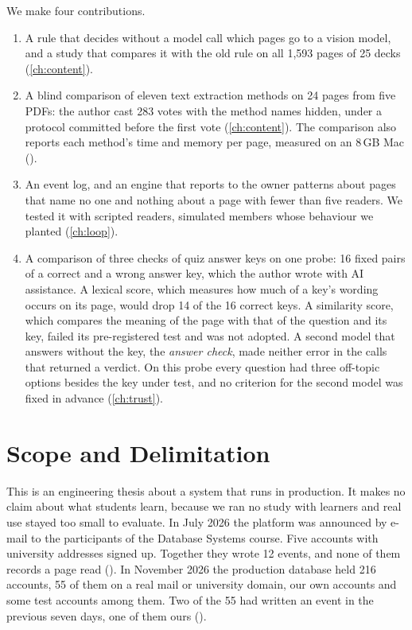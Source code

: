 We make four contributions.
\begin{enumerate}
  \item A rule that decides without a model call which pages go to a vision
    model, and a study that compares it with the old rule on all 1{,}593
    pages of 25 decks (\cref{ch:content}).
  \item A blind comparison of eleven text extraction methods on 24 pages from
    five PDFs: the author cast 283 votes with the method names
    hidden, under a protocol committed before the first vote
    (\cref{ch:content}). The comparison also reports each method's time and
    memory per page, measured on an 8\,GB Mac
    ().
  \item An event log, and an engine that reports to the owner patterns about
    pages that name no one and nothing about a page with fewer than five
    readers. We tested it with scripted readers, simulated members whose
    behaviour we planted (\cref{ch:loop}).
  \item A comparison of three checks of quiz answer keys on one probe: 16
    fixed pairs of a correct and a wrong answer key, which the author wrote
    with AI assistance. A lexical score, which measures how much of a key's wording
    occurs on its page, would drop 14 of the 16 correct keys. A similarity
    score, which compares the meaning of the page with that of the question
    and its key, failed its pre-registered test and was not adopted. A second model that answers without the key, the \emph{answer check}, made neither error
    in the calls that returned a verdict. On this probe every question had
    three off-topic options besides the key under test, and no criterion for
    the second model was fixed in advance (\cref{ch:trust}).
\end{enumerate}

\section{Scope and Delimitation}
\label{sec:scope}

This is an engineering thesis about a system that runs in production. It
makes no claim about what students learn, because we ran no study with
learners and real use stayed too small to evaluate. In July 2026 the platform
was announced by e-mail to the participants of the Database Systems course.
Five accounts with university addresses signed up. Together they wrote 12
events, and none of them records a page read
().
In November 2026 the production database held 216 accounts, 55 of them on a
real mail or university domain, our own accounts and some test accounts among
them. Two of the 55 had written an event in the previous seven days, one of
them ours
().

